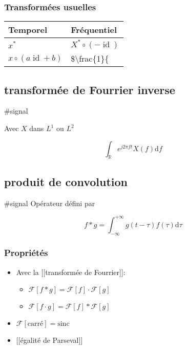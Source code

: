 \documentclass[
]{article}
\providecommand{\tightlist}{%
  \setlength{\itemsep}{0pt}\setlength{\parskip}{0pt}}
\begin{document}
\hypertarget{transformuxe9es-usuelles}{%
\subsubsection{Transformées usuelles}\label{transformuxe9es-usuelles}}

\begin{longtable}[]{@{}ll@{}}
\toprule()
Temporel & Fréquentiel \\
\midrule()
\endhead
\(x^\ast\) & \(X^\ast \circ (-\operatorname{id})\) \\
\(x \circ (a \operatorname{id} + b)\) & \$\textbackslash frac\{1\}\{ \\
\bottomrule()
\end{longtable}

\hypertarget{transformuxe9e-de-fourrier-inverse}{%
\subsection{transformée de Fourrier
inverse}\label{transformuxe9e-de-fourrier-inverse}}

\#signal

Avec \(X\) dans \(L^1\) ou \(L^2\)

\[
\int_\mathbb{R} e^{j2\pi ft} X(f) \mathrm{d}f
\]

\hypertarget{produit-de-convolution}{%
\subsection{produit de convolution}\label{produit-de-convolution}}

\#signal Opérateur défini par

\[
f \ast g = \int_{-\infty}^{+\infty} g(t-\tau) f(\tau) \mathrm{d}\tau
\]

\hypertarget{propriuxe9tuxe9s-1}{%
\subsubsection{Propriétés}\label{propriuxe9tuxe9s-1}}

\begin{itemize}
\item
  Avec la {[}{[}transformée de Fourrier{]}{]}:

  \begin{itemize}
  \tightlist
  \item
    \(\mathcal{F}[f \ast g] = \mathcal{F}[f]\cdot \mathcal{F}[g]\)
  \item
    \(\mathcal{F}[f\cdot g] = \mathcal{F}[f] \ast \mathcal{F}[g]\)
  \end{itemize}
\item
  \(\mathcal{F}[\text{carré}] = \text{sinc}\)
\item
  {[}{[}égalité de Parseval{]}{]}
\end{itemize}
\end{document}
